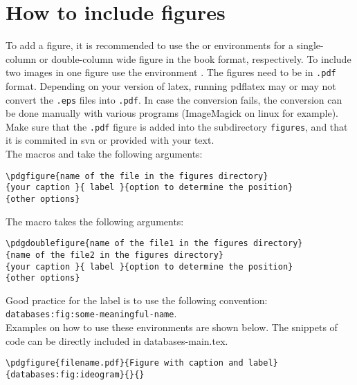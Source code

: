 \section{How to include figures}

To add a figure, it is recommended to use the {\tt \string\pdgfigure} or {\tt \string\pdgwidefigure} environments
for a single-column or double-column wide figure in the book format, respectively. To include two images in one figure use the environment {\tt \string\pdgdoublefigure}.
The figures need to be in {\tt .pdf} format. Depending on your version of latex, running pdflatex may or may not convert the {\tt .eps} files into {\tt .pdf}. In case the conversion fails, the conversion can be done manually with various programs (ImageMagick on linux for example).
Make sure that the {\tt .pdf} figure is added into the subdirectory {\tt figures}, and that it is commited in svn or provided with your text.\\
The macros {\tt \string\pdgfigure} and {\tt \string\pdgwidefigure} take the following arguments:
\begin{verbatim}
\pdgfigure{name of the file in the figures directory}
{your caption }{ label }{option to determine the position}
{other options}
\end{verbatim}
The macro {\tt \string\pdgdoublefigure} takes the following arguments:
\begin{verbatim}
\pdgdoublefigure{name of the file1 in the figures directory}
{name of the file2 in the figures directory}
{your caption }{ label }{option to determine the position}
{other options}
\end{verbatim}

Good practice for the label is to use the following convention: {\tt databases:fig:some-meaningful-name}.\\
Examples on how to use these environments are shown below. The snippets of code can be directly included in databases-main.tex.
\begin{verbatim}
\pdgfigure{filename.pdf}{Figure with caption and label}
{databases:fig:ideogram}{}{}
\end{verbatim}

